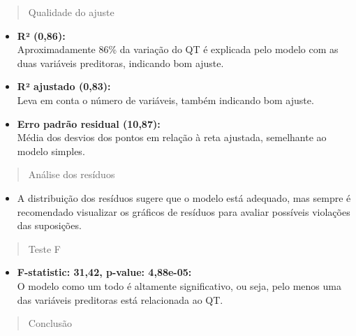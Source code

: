 \documentclass[
]{book}
\providecommand{\tightlist}{%
  \setlength{\itemsep}{0pt}\setlength{\parskip}{0pt}}
\begin{document}
\begin{quote}
Qualidade do ajuste
\end{quote}

\begin{itemize}
\tightlist
\item
  \textbf{R² (0,86):}\\
  Aproximadamente 86\% da variação do QT é explicada pelo modelo com as duas variáveis preditoras, indicando bom ajuste.
\item
  \textbf{R² ajustado (0,83):}\\
  Leva em conta o número de variáveis, também indicando bom ajuste.
\item
  \textbf{Erro padrão residual (10,87):}\\
  Média dos desvios dos pontos em relação à reta ajustada, semelhante ao modelo simples.
\end{itemize}

\begin{quote}
Análise dos resíduos
\end{quote}

\begin{itemize}
\tightlist
\item
  A distribuição dos resíduos sugere que o modelo está adequado, mas sempre é recomendado visualizar os gráficos de resíduos para avaliar possíveis violações das suposições.
\end{itemize}

\begin{quote}
Teste F
\end{quote}

\begin{itemize}
\tightlist
\item
  \textbf{F-statistic: 31,42, p-value: 4,88e-05:}\\
  O modelo como um todo é altamente significativo, ou seja, pelo menos uma das variáveis preditoras está relacionada ao QT.
\end{itemize}

\begin{quote}
Conclusão
\end{quote}
\end{document}
